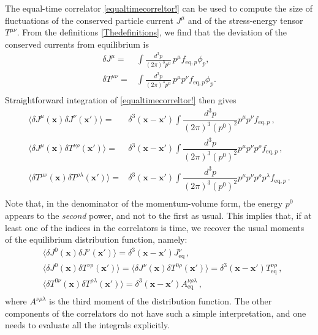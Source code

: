 \documentclass[aps,prd,preprint,nofootinbib,amsmath,amssymb,showpacs,longbibliography,singlecolumn,superscriptaddress,10pt]{revtex4-1}
\theoremstyle{plain}
\theoremstyle{definition}
\begin{document}
The equal-time correlator \eqref{equaltimecorreltor!} can be used to compute the size of fluctuations of the conserved particle current $J^\mu$ and of the stress-energy tensor $T^{\mu \nu}$. From the definitions \eqref{Thedefinitions}, we find that the deviation of the conserved currents from equilibrium is
\begin{equation}%
\begin{split}\label{maladefinizioneequesta}
    \delta J^{\mu} ={}& \int \frac{d^3p}{(2\pi)^3 p^0} \, p^{\mu} f_{\text{eq},p}\phi_p ,\\
    \delta T^{\mu\nu} ={}& \int \frac{d^3p}{(2\pi)^3 p^0} \, p^{\mu} p^{\nu} f_{\text{eq},p}\phi_p .\\
    \end{split}
\end{equation}
Straightforward integration of \eqref{equaltimecorreltor!} then gives
\begin{equation}
\begin{split}
\langle \delta J^\mu(\textbf{x})\delta J^\nu(\textbf{x}')\rangle ={}& \delta^3(\textbf{x}{-}\textbf{x}') \int \dfrac{d^3p}{(2\pi)^3(p^0)^2} p^\mu p^\nu f_{\text{eq},p} \, , \\
\langle \delta J^\mu(\textbf{x})\delta T^{\nu\rho}(\textbf{x}')\rangle ={}& \delta^3(\textbf{x}{-}\textbf{x}') \int \dfrac{d^3p}{(2\pi)^3(p^0)^2} p^\mu p^\nu p^\rho f_{\text{eq},p} \, , \\
\langle \delta T^{\mu\nu}(\textbf{x})\delta T^{\rho \lambda}(\textbf{x}')\rangle ={}& \delta^3(\textbf{x}{-}\textbf{x}') \int \dfrac{d^3p}{(2\pi)^3(p^0)^2} p^\mu p^\nu p^\rho p^\lambda f_{\text{eq},p} \, . \\
\end{split}
\end{equation}
Note that, in the denominator of the momentum-volume form, the energy $p^0$ appears to the \textit{second} power, and not to the first as usual. This implies that, if at least one of the indices in the correlators is time, we recover the usual moments of the equilibrium distribution function, namely:
\begin{equation}
\begin{split}
&\langle \delta J^0(\textbf{x})\delta J^\nu(\textbf{x}')\rangle = \delta^3(\textbf{x}{-}\textbf{x}') J_{\text{eq}}^\nu \, , \\
& \langle \delta J^0(\textbf{x})\delta T^{\nu\rho}(\textbf{x}')\rangle = \langle \delta J^\nu(\textbf{x})\delta T^{0\rho}(\textbf{x}')\rangle = \delta^3(\textbf{x}{-}\textbf{x}') T_{\text{eq}}^{\nu \rho} \, , \\
&\langle \delta T^{0\nu}(\textbf{x})\delta T^{\rho \lambda}(\textbf{x}')\rangle =\delta^3(\textbf{x}{-}\textbf{x}') A_{\text{eq}}^{\nu \rho \lambda} \, , \\
\end{split}
\end{equation}
where $A^{\nu \rho \lambda}$ is the third moment of the distribution function. The other components of the correlators do not have such a simple interpretation, and one needs to evaluate all the integrals explicitly.
\end{document}
